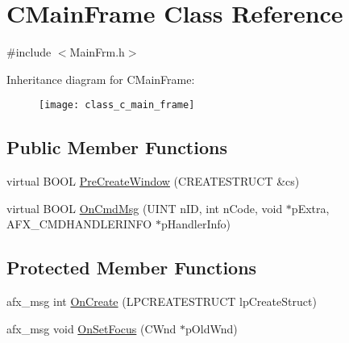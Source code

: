 \hypertarget{class_c_main_frame}{}\section{C\+Main\+Frame Class Reference}
\label{class_c_main_frame}


{\ttfamily \#include $<$Main\+Frm.\+h$>$}

Inheritance diagram for C\+Main\+Frame\+:\begin{figure}[H]
\begin{center}
\leavevmode
\texttt{[image: class\_c\_main\_frame]}
\end{center}
\end{figure}
\subsection*{Public Member Functions}
\begin{DoxyCompactItemize}
\item 
virtual B\+O\+OL \mbox{\hyperlink{class_c_main_frame_a549bf677c955c2898c3c683321633c16}{Pre\+Create\+Window}} (C\+R\+E\+A\+T\+E\+S\+T\+R\+U\+CT \&cs)
\item 
virtual B\+O\+OL \mbox{\hyperlink{class_c_main_frame_ade959eb0bab719bf06bb9b18ee407101}{On\+Cmd\+Msg}} (U\+I\+NT n\+ID, int n\+Code, void $\ast$p\+Extra, A\+F\+X\+\_\+\+C\+M\+D\+H\+A\+N\+D\+L\+E\+R\+I\+N\+FO $\ast$p\+Handler\+Info)
\end{DoxyCompactItemize}
\subsection*{Protected Member Functions}
\begin{DoxyCompactItemize}
\item 
afx\+\_\+msg int \mbox{\hyperlink{class_c_main_frame_a48666466fd37412fcaeff75c3b12e0ed}{On\+Create}} (L\+P\+C\+R\+E\+A\+T\+E\+S\+T\+R\+U\+CT lp\+Create\+Struct)
\item 
afx\+\_\+msg void \mbox{\hyperlink{class_c_main_frame_adc353a3d1fc497fbc009b6d9e6914a82}{On\+Set\+Focus}} (C\+Wnd $\ast$p\+Old\+Wnd)
\end{DoxyCompactItemize}
